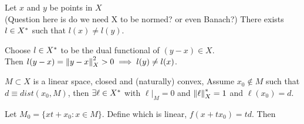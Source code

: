 \begin{proposition}\label{separations}\rm\nextline
	Let $x$ and $y$ be points in $X$ \placeholder \\
	(Question here is do  we need X to be normed? or even Banach?)
	There exists $l\in{X}^*$ such that $l(x)\neq l(y)$.
	\begin{pf}{}{}
		Choose $l\in {X}^*$ to be the dual functional of $(y-x)\in X$. \\Then $l(y-x)=\left\|{y-x}\right\|^2_X>0\implies l(y)\neq l(x)$.
	\end{pf}
\end{proposition}

\begin{proposition}\rm\nextline
$M\subset X$ is a linear space, closed and (naturally) convex, Assume $x_0\not\in M$ such that $d\equiv dist(x_0,M)$, then $\exists \ell\in{X}^*$ with $\ell|_M=0$ and $\left\|{\ell}\right\|_{X}^*=1$ and $\ell(x_0)=d$.
\begin{pf}{}{}
	Let $M_0=\{xt+x_0:x\in M\}$. Define  which is linear, $f(x+tx_0)=td$. Then\\
	\placeholder
\end{pf}
\end{proposition}